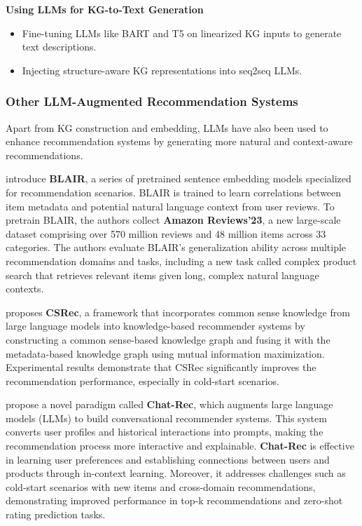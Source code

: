\documentclass{article}
\begin{document}
\textbf{Using LLMs for KG-to-Text Generation}
\begin{itemize}
  \item Fine-tuning LLMs like BART and T5 on linearized KG inputs to generate text descriptions. 
  \item Injecting structure-aware KG representations into seq2seq LLMs. 
\end{itemize}


\subsubsection{Other LLM-Augmented Recommendation Systems}
Apart from KG construction and embedding, LLMs have also been used to enhance recommendation systems by generating more natural and context-aware recommendations.

\textbf{\cite{hou2024bridging}}  introduce \textbf{BLAIR}, a series of pretrained sentence embedding models specialized for recommendation scenarios. BLAIR is trained to learn correlations between item metadata and potential natural language context from user reviews. To pretrain BLAIR, the authors collect \textbf{Amazon Reviews'23}, a new large-scale dataset comprising over 570 million reviews and 48 million items across 33 categories.
The authors evaluate BLAIR's generalization ability across multiple recommendation domains and tasks, including a new task called complex product search that retrieves relevant items given long, complex natural language contexts.

\textbf{\cite{yang2024common}} proposes \textbf{CSRec}, a framework that incorporates common sense knowledge from large language models into knowledge-based recommender systems by constructing a common sense-based knowledge graph and fusing it with the metadata-based knowledge graph using mutual information maximization. Experimental results demonstrate that CSRec significantly improves the recommendation performance, especially in cold-start scenarios.

  
\textbf{\cite{gao2023chatrec}} propose a novel paradigm called \textbf{Chat-Rec}, which augments large language models (LLMs) to build conversational recommender systems. This system converts user profiles and historical interactions into prompts, making the recommendation process more interactive and explainable. \textbf{Chat-Rec} is effective in learning user preferences and establishing connections between users and products through in-context learning. Moreover, it addresses challenges such as cold-start scenarios with new items and cross-domain recommendations, demonstrating improved performance in top-k recommendations and zero-shot rating prediction tasks.
\end{document}
